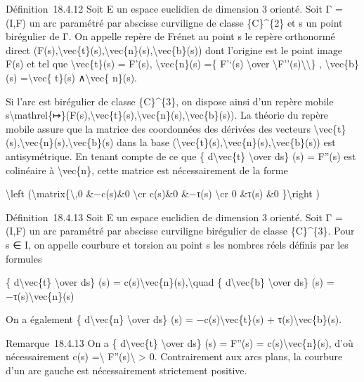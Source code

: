 \documentclass[]{article}
\begin{document}
Définition~18.4.12 Soit E un espace euclidien de dimension 3 orienté.
Soit Γ = (I,F) un arc paramétré par abscisse curviligne de classe
\{C\}\^{}\{2\} et s un point birégulier de Γ. On appelle repère de
Frénet au point s le repère orthonormé direct
(F(s),\textbackslash{}vec\{t\}(s),\textbackslash{}vec\{n\}(s),\textbackslash{}vec\{b\}(s))
dont l'origine est le point image F(s) et tel que
\textbackslash{}vec\{t\}(s) = F'(s), \textbackslash{}vec\{n\}(s) =\{
F'`(s) \textbackslash{}over
\textbackslash{}\textbar{}F''(s)\textbackslash{}\textbar{}\textbackslash{}\textbar{}\}
, \textbackslash{}vec\{b\}(s) =\textbackslash{}vec\{ t\}(s)
∧\textbackslash{}vec\{ n\}(s).

Si l'arc est birégulier de classe \{C\}\^{}\{3\}, on dispose ainsi d'un
repère mobile
s\textbackslash{}mathrel\{↦\}(F(s),\textbackslash{}vec\{t\}(s),\textbackslash{}vec\{n\}(s),\textbackslash{}vec\{b\}(s)).
La théorie du repère mobile assure que la matrice des coordonnées des
dérivées des vecteurs
\textbackslash{}vec\{t\}(s),\textbackslash{}vec\{n\}(s),\textbackslash{}vec\{b\}(s)
dans la base
(\textbackslash{}vec\{t\}(s),\textbackslash{}vec\{n\}(s),\textbackslash{}vec\{b\}(s))
est antisymétrique. En tenant compte de ce que \{
d\textbackslash{}vec\{t\} \textbackslash{}over ds\} (s) = F''(s) est
colinéaire à \textbackslash{}vec\{n\}, cette matrice est nécessairement
de la forme

\textbackslash{}left (\textbackslash{}matrix\{\textbackslash{},0
\&−c(s)\&0 \textbackslash{}cr c(s)\&0 \&−τ(s) \textbackslash{}cr 0
\&τ(s) \&0 \}\textbackslash{}right )

Définition~18.4.13 Soit E un espace euclidien de dimension 3 orienté.
Soit Γ = (I,F) un arc paramétré par abscisse curviligne birégulier de
classe \{C\}\^{}\{3\}. Pour s ∈ I, on appelle courbure et torsion au
point s les nombres réels définis par les formules

\{ d\textbackslash{}vec\{t\} \textbackslash{}over ds\} (s) =
c(s)\textbackslash{}vec\{n\}(s),\textbackslash{}quad \{
d\textbackslash{}vec\{b\} \textbackslash{}over ds\} (s) =
−τ(s)\textbackslash{}vec\{n\}(s)

On a également \{ d\textbackslash{}vec\{n\} \textbackslash{}over ds\}
(s) = −c(s)\textbackslash{}vec\{t\}(s) +
τ(s)\textbackslash{}vec\{b\}(s).

Remarque~18.4.13 On a \{ d\textbackslash{}vec\{t\} \textbackslash{}over
ds\} (s) = F''(s) = c(s)\textbackslash{}vec\{n\}(s), d'où nécessairement
c(s) =\textbackslash{}\textbar{} F''(s)\textbackslash{}\textbar{}
\textgreater{} 0. Contrairement aux arcs plans, la courbure d'un arc
gauche est nécessairement strictement positive.
\end{document}

